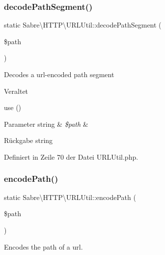 \subsubsection{\texorpdfstring{decode\+Path\+Segment()}{decodePathSegment()}}
{\footnotesize\ttfamily static Sabre\textbackslash{}\+H\+T\+T\+P\textbackslash{}\+U\+R\+L\+Util\+::decode\+Path\+Segment (\begin{DoxyParamCaption}\item[{}]{\$path }\end{DoxyParamCaption})\hspace{0.3cm}{\ttfamily [static]}}

Decodes a url-\/encoded path segment

\begin{DoxyRefDesc}{Veraltet}
\item[\mbox{\hyperlink{deprecated__deprecated000053}{Veraltet}}]use () \end{DoxyRefDesc}

\begin{DoxyParams}[1]{Parameter}
string & {\em \$path} & \\
\hline
\end{DoxyParams}
\begin{DoxyReturn}{Rückgabe}
string 
\end{DoxyReturn}


Definiert in Zeile 70 der Datei U\+R\+L\+Util.\+php.

\mbox{\label{class_sabre_1_1_h_t_t_p_1_1_u_r_l_util_a3b0bc85646ab11c16d5db57d5dfb2997}} 
\subsubsection{\texorpdfstring{encode\+Path()}{encodePath()}}
{\footnotesize\ttfamily static Sabre\textbackslash{}\+H\+T\+T\+P\textbackslash{}\+U\+R\+L\+Util\+::encode\+Path (\begin{DoxyParamCaption}\item[{}]{\$path }\end{DoxyParamCaption})\hspace{0.3cm}{\ttfamily [static]}}

Encodes the path of a url.

